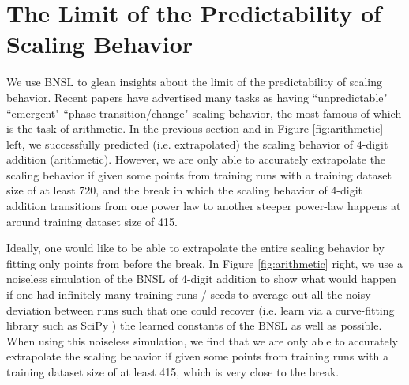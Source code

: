 \documentclass{article} %
\begin{document}
\section{The Limit of the Predictability of Scaling Behavior}
\label{section:limit_of_agi_superforecasting}
\vspace{-4.0mm}
We use BNSL to glean insights about the limit of the predictability of scaling behavior. Recent papers \citep{ganguli2022predictability, wei2022emergent} have advertised many tasks as having ``unpredictable" ``emergent" ``phase transition/change" scaling behavior, the most famous of which is the task of arithmetic. In the previous section and in Figure \ref{fig:arithmetic} left, we successfully predicted (i.e. extrapolated) the scaling behavior of 4-digit addition (arithmetic). However, we are only able to accurately extrapolate the scaling behavior if given some points from training runs with a training dataset size of at least 720, and the break in which the scaling behavior of 4-digit addition transitions from one power law to another steeper power-law happens at around training dataset size of 415. 

\vspace{-1.4mm}

Ideally, one would like to be able to extrapolate the entire scaling behavior by fitting only points from before the break. In Figure \ref{fig:arithmetic} right, we use a noiseless simulation of the BNSL of 4-digit addition to show what would happen if one had infinitely many training runs / seeds to average out all the noisy deviation between runs such that one could recover (i.e. learn via a curve-fitting library such as SciPy \citep{virtanen2020scipy}) the learned constants of the BNSL as well as possible. When using this noiseless simulation, we find that we are only able to accurately extrapolate the scaling behavior if given some points from training runs with a training dataset size of at least 415, which is very close to the break. 




\end{document}
